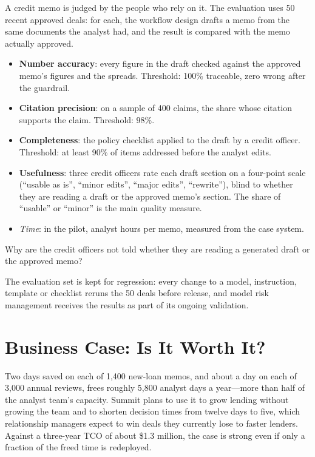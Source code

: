 A credit memo is judged by the people who rely on it. The evaluation uses 50 recent approved deals: for each, the workflow design drafts a memo from the same documents the analyst had, and the result is compared with the memo actually approved.
\begin{itemize}[itemsep=1pt]
  \item \textbf{Number accuracy}: every figure in the draft checked against the approved memo's figures and the spreads. Threshold: 100\% traceable, zero wrong after the guardrail.
  \item \textbf{Citation precision}: on a sample of 400 claims, the share whose citation supports the claim. Threshold: 98\%.
  \item \textbf{Completeness}: the policy checklist applied to the draft by a credit officer. Threshold: at least 90\% of items addressed before the analyst edits.
  \item \textbf{Usefulness}: three credit officers rate each draft section on a four-point scale (``usable as is'', ``minor edits'', ``major edits'', ``rewrite''), blind to whether they are reading a draft or the approved memo's section. The share of ``usable'' or ``minor'' is the main quality measure.
  \item \emph{Time}: in the pilot, analyst hours per memo, measured from the case system.
\end{itemize}
\begin{quickcheck}
Why are the credit officers not told whether they are reading a generated draft or the approved memo?
\end{quickcheck}

The evaluation set is kept for regression: every change to a model, instruction, template or checklist reruns the 50 deals before release, and model risk management receives the results as part of its ongoing validation.

\section{Business Case: Is It Worth It?}
\label{sec:loan-business}

Two days saved on each of 1{,}400 new-loan memos, and about a day on each of 3{,}000 annual reviews, frees roughly 5{,}800 analyst days a year---more than half of the analyst team's capacity. Summit plans to use it to grow lending without growing the team and to shorten decision times from twelve days to five, which relationship managers expect to win deals they currently lose to faster lenders. Against a three-year TCO of about \$1.3 million, the case is strong even if only a fraction of the freed time is redeployed.

